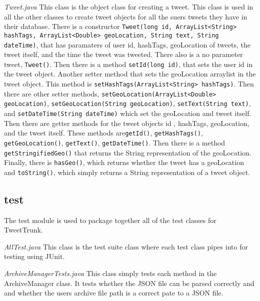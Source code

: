 \documentclass[a4paper, 12pt]{article}
\begin{document}
\begin{adjustwidth}{2em}{0pt}
\begin{adjustwidth}{2em}{0pt}
\noindent  \textit{Tweet.java}  \newline
This class is the object class for creating a tweet. This class is used in all the other classes to create tweet objects for all the suers tweets they have in their database. There is a constructor \texttt {Tweet(long id, ArrayList<String> hashTags, ArrayList<Double> geoLocation, String text, String dateTime)}, that has paramaters of user id, hashTags, geoLocation of tweets, the tweet itself, and the time the tweet was tweeted. There also is a no parameter tweet, \texttt {Tweet()}.  Then there is a method \texttt {setId(long id)}, that sets the user id in the tweet object. Another setter method that sets the geoLocation arraylist in the tweet object. This method is \texttt {setHashTags(ArrayList<String> hashTags)}. Then there are other setter methods, \texttt {setGeoLocation(ArrayList<Double> geoLocation)}, \texttt {setGeoLocation(String geoLocation)}, \texttt {setText(String text)}, and \texttt {setDateTime(String dateTime)} which set the geoLocation and tweet itself. Then there are getter methods for the tweet objects id , hashTags, geoLocation, and the tweet itself. These methods are\texttt {getId()}, \texttt {getHashTags()}, \texttt {getGeoLocation()}, \texttt {getText()}, \texttt {getDateTime()}. Then there is a method  \texttt{getStringifiedGeo()} that returns the String representation of the geoLocation. Finally, there is \texttt {hasGeo()}, which returns whether the tweet has a geoLocation and \texttt {toString()}, which simply returns a String representation of a tweet object. \newline\newline

\end{adjustwidth}


\subsection{test} \label{sec:archa}
\begin{adjustwidth}{2em}{0pt}
The test module is used to package together all of the test classes for TweetTrunk.\newline

\noindent  \textit{AllTest.java} \newline
This class is the test suite class where each test class pipes into for testing using JUnit. \newline

\noindent \textit{ArchiveManagerTests.java} \newline
This class simply tests each method in the ArchiveManager class. It tests whether the JSON file can be parsed correctly and and whether the users archive file path is a correct pate to a JSON file.\newline


\end{adjustwidth}
\end{adjustwidth}
\end{document}
